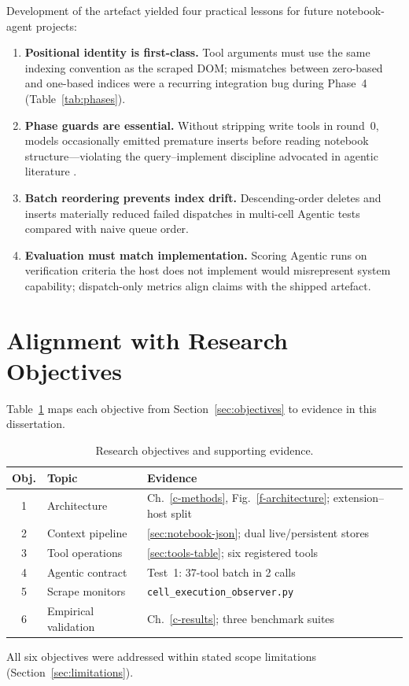 Development of the artefact yielded four practical lessons for future notebook-agent projects:

\begin{enumerate}
  \item \textbf{Positional identity is first-class.} Tool arguments must use the same indexing convention as the scraped \ac{DOM}; mismatches between zero-based and one-based indices were a recurring integration bug during Phase~4 (Table~\ref{tab:phases}).
  \item \textbf{Phase guards are essential.} Without stripping write tools in round~0, models occasionally emitted premature inserts before reading notebook structure---violating the query--implement discipline advocated in agentic literature \parencite{yao2023react}.
  \item \textbf{Batch reordering prevents index drift.} Descending-order deletes and inserts materially reduced failed dispatches in multi-cell Agentic tests compared with naive queue order.
  \item \textbf{Evaluation must match implementation.} Scoring Agentic runs on verification criteria the host does not implement would misrepresent system capability; dispatch-only metrics align claims with the shipped artefact.
\end{enumerate}

\section{Alignment with Research Objectives}

Table~\ref{tab:objective-map} maps each objective from Section~\ref{sec:objectives} to evidence in this dissertation.

\begin{table}[!ht]
\centering
\caption{Research objectives and supporting evidence.}
\label{tab:objective-map}
\small
\begin{tabular}{|c|p{4.2cm}|p{5.8cm}|}
\hline
\textbf{Obj.} & \textbf{Topic} & \textbf{Evidence} \\ \hline
1 & Architecture & Ch.~\ref{c-methods}, Fig.~\ref{f-architecture}; extension--host split \\ \hline
2 & Context pipeline & \ref{sec:notebook-json}; dual live/persistent stores \\ \hline
3 & Tool operations & \ref{sec:tools-table}; six registered tools \\ \hline
4 & Agentic contract & Test~1: 37-tool batch in 2 calls \\ \hline
5 & Scrape monitors & \texttt{cell\_execution\_observer.py} \\ \hline
6 & Empirical validation & Ch.~\ref{c-results}; three benchmark suites \\ \hline
\end{tabular}
\end{table}

All six objectives were addressed within stated scope limitations (Section~\ref{sec:limitations}).
